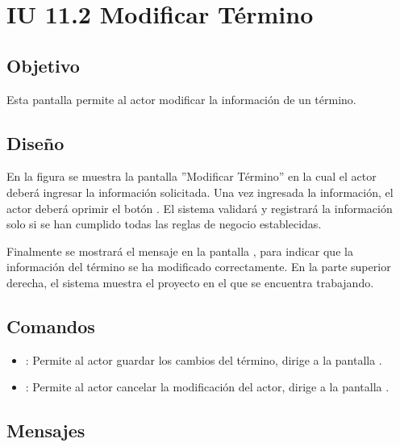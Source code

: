 \section{IU 11.2 Modificar Término}

\subsection{Objetivo}
	Esta pantalla permite al actor modificar la información de un término.
\subsection{Diseño}
	En la figura  se muestra la pantalla ''Modificar Término'' en la cual el actor deberá ingresar la información solicitada.
	Una vez ingresada la información, el actor deberá oprimir el botón  . El sistema validará y registrará la información solo si se han cumplido todas las reglas de negocio establecidas.
	
	Finalmente se mostrará el mensaje  en la pantalla , para indicar que la información del término se ha modificado correctamente.
	En la parte superior derecha, el sistema muestra el proyecto en el que se encuentra trabajando.

\subsection{Comandos}
\begin{itemize}
	\item {}: Permite al actor guardar los cambios del término, dirige a la pantalla .
	\item {}: Permite al actor cancelar la modificación del actor, dirige a la pantalla .
\end{itemize}

\subsection{Mensajes}

